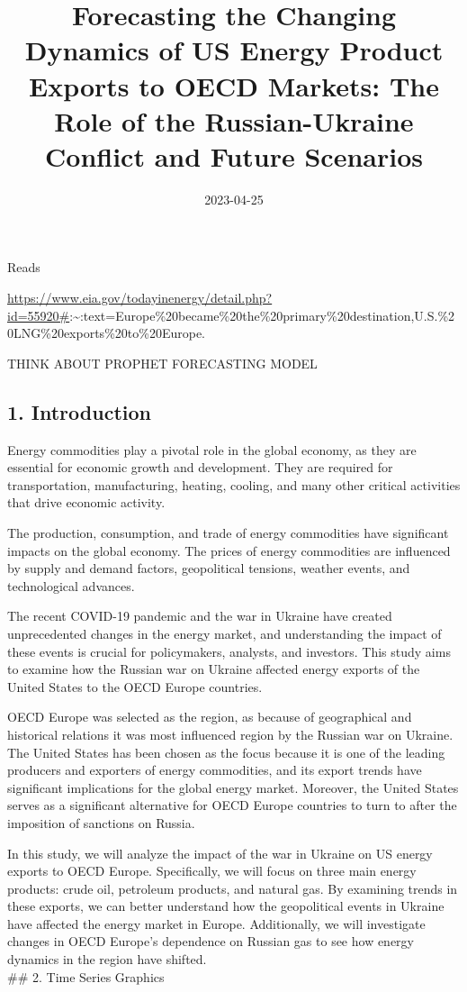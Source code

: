 \documentclass[
]{article}
\title{Forecasting the Changing Dynamics of US Energy Product Exports to
OECD Markets: The Role of the Russian-Ukraine Conflict and Future
Scenarios}
\author{}
\date{\vspace{-2.5em}2023-04-25}
\begin{document}
\maketitle

{
\setcounter{tocdepth}{3}
\tableofcontents
}
\newpage

Reads

\url{https://www.eia.gov/todayinenergy/detail.php?id=55920\#}:\textasciitilde:text=Europe\%20became\%20the\%20primary\%20destination,U.S.\%20LNG\%20exports\%20to\%20Europe.

THINK ABOUT PROPHET FORECASTING MODEL \newpage

\hypertarget{introduction}{%
\subsection{1. Introduction}\label{introduction}}

\linebreak

Energy commodities play a pivotal role in the global economy, as they
are essential for economic growth and development. They are required for
transportation, manufacturing, heating, cooling, and many other critical
activities that drive economic activity.

The production, consumption, and trade of energy commodities have
significant impacts on the global economy. The prices of energy
commodities are influenced by supply and demand factors, geopolitical
tensions, weather events, and technological advances.

The recent COVID-19 pandemic and the war in Ukraine have created
unprecedented changes in the energy market, and understanding the impact
of these events is crucial for policymakers, analysts, and investors.
This study aims to examine how the Russian war on Ukraine affected
energy exports of the United States to the OECD Europe countries.

OECD Europe was selected as the region, as because of geographical and
historical relations it was most influenced region by the Russian war on
Ukraine. The United States has been chosen as the focus because it is
one of the leading producers and exporters of energy commodities, and
its export trends have significant implications for the global energy
market. Moreover, the United States serves as a significant alternative
for OECD Europe countries to turn to after the imposition of sanctions
on Russia.

In this study, we will analyze the impact of the war in Ukraine on US
energy exports to OECD Europe. Specifically, we will focus on three main
energy products: crude oil, petroleum products, and natural gas. By
examining trends in these exports, we can better understand how the
geopolitical events in Ukraine have affected the energy market in
Europe. Additionally, we will investigate changes in OECD Europe's
dependence on Russian gas to see how energy dynamics in the region have
shifted.\\
\linebreak   \linebreak      \#\# 2. Time Series Graphics
\end{document}
